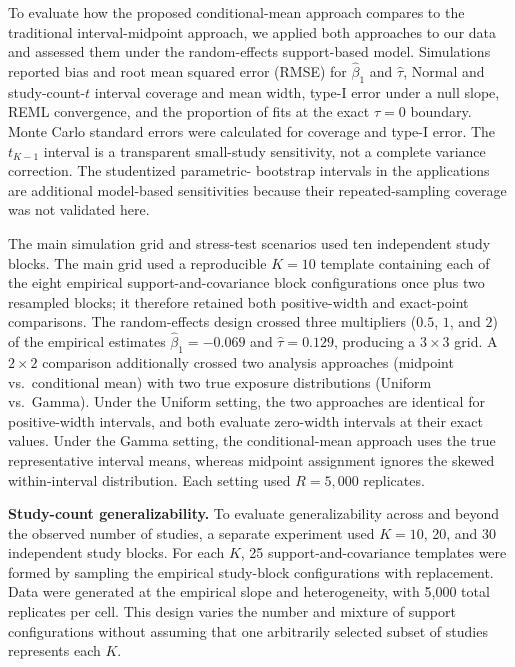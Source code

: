 \documentclass[journal=rsm]{CUP-JNL-DTM}%
\theoremstyle{definition}
\numberwithin{equation}{section}
\begin{document}
To evaluate how the proposed conditional-mean approach compares to the
traditional interval-midpoint approach, we applied both approaches to our data
and assessed them under the random-effects support-based model. Simulations
reported bias and root mean squared error (RMSE) for $\hat\beta_1$ and
$\hat\tau$, Normal and study-count-$t$ interval coverage and mean width,
type-I error under a null slope, REML convergence, and the proportion of fits
at the exact $\tau=0$ boundary. Monte Carlo standard errors were calculated for
coverage and type-I error. The $t_{K-1}$ interval is a transparent small-study
sensitivity, not a complete variance correction. The studentized parametric-
bootstrap intervals in the applications are additional model-based
sensitivities because their repeated-sampling coverage was not validated here.

The main simulation grid and stress-test scenarios used ten independent study
blocks. The main grid used a reproducible $K=10$ template containing each of
the eight empirical support-and-covariance block configurations once plus two resampled
blocks; it therefore retained both positive-width and exact-point comparisons.
The random-effects design crossed three multipliers ($0.5$, $1$, and $2$) of
the empirical estimates $\hat\beta_1=-0.069$ and $\hat\tau=0.129$, producing a
$3\times3$ grid. A $2\times2$ comparison additionally crossed two analysis
approaches (midpoint vs.\ conditional mean) with two true exposure
distributions (Uniform vs.\ Gamma). Under the Uniform setting, the two
approaches are identical for positive-width intervals, and both evaluate
zero-width intervals at their exact values. Under the Gamma setting, the
conditional-mean approach uses the true representative interval means,
whereas midpoint assignment ignores the skewed within-interval distribution.
Each setting used $R=5{,}000$ replicates.

\noindent\textbf{Study-count generalizability.}
To evaluate generalizability across and beyond the observed number of studies, a separate
experiment used $K=10$, 20, and 30 independent study blocks. For each $K$,
25 support-and-covariance templates were formed by sampling the empirical
study-block configurations with replacement. Data were generated at the empirical slope
and heterogeneity, with 5,000 total replicates per cell.
This design varies the number and mixture of support configurations without
assuming that one arbitrarily selected subset of studies represents each $K$.
\end{document}
